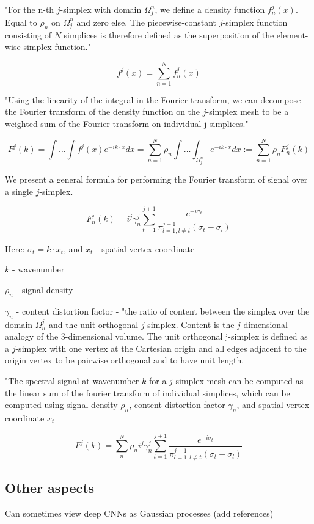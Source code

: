 \documentclass[english]{article}
\begin{document}
"For the n-th $j$-simplex with domain $\Omega_j^n$, we define a density function $f
^j_n(x)$. Equal to $\rho_n$ on $\Omega_j^n$ and zero else. The piecewise-constant $j$-simplex function consisting of $N$ simplices is therefore defined as the superposition of the element-wise simplex function."

$$f^j(x) =
\sum^N_{n=1}f^j_n(x)
$$

"Using the linearity of the integral in the Fourier
transform, we can decompose the Fourier transform of the density function on the $j$-simplex mesh to be a weighted sum of the Fourier transform on individual j-simplices."

$$F^j(k) =
\int\ldots\int f^j(x)e^{-ik\cdot x}dx =
\sum^N_{n=1}\rho_n
\int\ldots\int_{\Omega_j^n}e^{-ik\cdot x}dx
:=
\sum^N_{n=1}\rho_n F^j_n(k)
$$

We present a general formula for performing the Fourier transform of signal over a single $j$-simplex.

$$F^j_n(k) =
i^j \gamma^j_n
\sum^{j+1}_{t=1}
\frac{e^{-i\sigma_t}}
{\pi^{j+1}_{l=1,l\neq t} (\sigma_t - \sigma_l)}
$$


Here:  $\sigma_t = k\cdot x_t$, and $x_t$ - spatial vertex coordinate

$k$ - wavenumber

$\rho_n$ - signal density

$\gamma_n$ - content distortion factor -  "the ratio of content between the simplex over the domain $\Omega^j_n$ and the unit orthogonal $j$-simplex. Content is the $j$-dimensional analogy of the
3-dimensional volume. The unit orthogonal j-simplex is defined as a $j$-simplex with one vertex at the
Cartesian origin and all edges adjacent to the origin vertex to be pairwise orthogonal and to have unit
length.


"The spectral signal at wavenumber $k$ for a $j$-simplex mesh can be computed as the linear sum of the fourier transform of individual simplices, which can be computed using signal density $\rho_n$, content distortion factor 
$\gamma_n$, and spatial vertex coordinate $x_t$

$$F^j(k) =
\sum^N_n
\rho_n i^j \gamma^j_n
\sum^{j+1}_{t=1}
\frac{e^{-i\sigma_t}}
{\pi^{j+1}_{l=1,l\neq t} (\sigma_t - \sigma_l)}
$$



\eitem 



\subsection{Other aspects}
\benum
\item Can sometimes view deep CNNs as Gaussian processes (add references)
\end{document}
